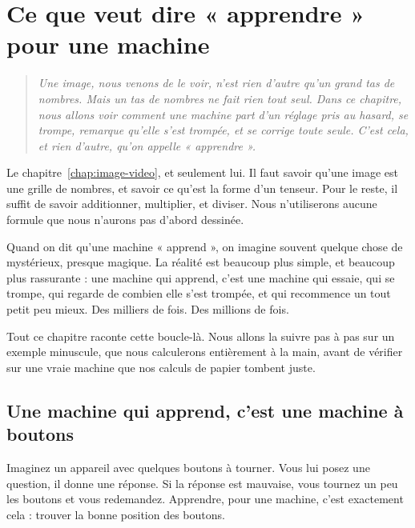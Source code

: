 \chapter{Ce que veut dire « apprendre » pour une machine}
\label{chap:apprendre}

\begin{quote}\itshape
Une image, nous venons de le voir, n'est rien d'autre qu'un grand tas de
nombres. Mais un tas de nombres ne fait rien tout seul. Dans ce chapitre,
nous allons voir comment une machine part d'un réglage pris au hasard, se
trompe, remarque qu'elle s'est trompée, et se corrige toute seule. C'est
cela, et rien d'autre, qu'on appelle « apprendre ».
\end{quote}

\begin{prerequis}
Le chapitre~\ref{chap:image-video}, et seulement lui. Il faut savoir qu'une
image est une grille de nombres, et savoir ce qu'est la forme d'un tenseur.
Pour le reste, il suffit de savoir additionner, multiplier, et diviser. Nous
n'utiliserons aucune formule que nous n'aurons pas d'abord dessinée.
\end{prerequis}

Quand on dit qu'une machine « apprend », on imagine souvent quelque chose de
mystérieux, presque magique. La réalité est beaucoup plus simple, et
beaucoup plus rassurante : une machine qui apprend, c'est une machine qui
essaie, qui se trompe, qui regarde de combien elle s'est trompée, et qui
recommence un tout petit peu mieux. Des milliers de fois. Des millions de
fois.

Tout ce chapitre raconte cette boucle-là. Nous allons la suivre pas à pas
sur un exemple minuscule, que nous calculerons entièrement à la main, avant
de vérifier sur une vraie machine que nos calculs de papier tombent juste.

\section{Une machine qui apprend, c'est une machine à boutons}

\begin{enclair}
Imaginez un appareil avec quelques boutons à tourner. Vous lui posez une
question, il donne une réponse. Si la réponse est mauvaise, vous tournez un
peu les boutons et vous redemandez. Apprendre, pour une machine, c'est
exactement cela : trouver la bonne position des boutons.
\end{enclair}

